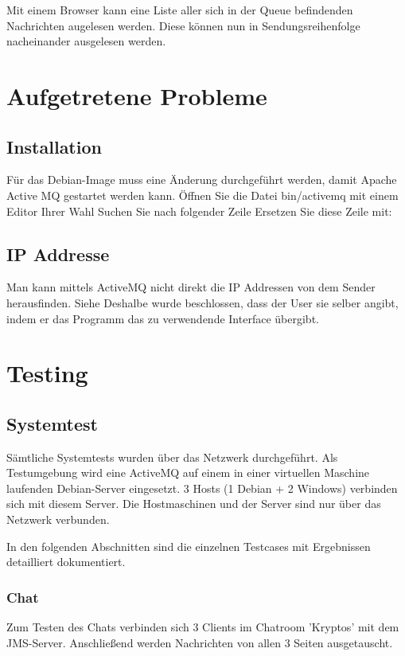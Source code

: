 \documentclass[11pt, a4paper]{article}
\begin{document}
Mit einem Browser kann eine Liste aller sich in der Queue befindenden Nachrichten augelesen werden. Diese können nun in Sendungsreihenfolge nacheinander
ausgelesen werden.

\newpage

\section{Aufgetretene Probleme}
\subsection{Installation}
Für das Debian-Image muss eine Änderung durchgeführt werden, damit Apache Active MQ gestartet werden kann.
Öffnen Sie die Datei bin/activemq mit einem Editor Ihrer Wahl 
Suchen Sie nach folgender Zeile
Ersetzen Sie diese Zeile mit:
\subsection{IP Addresse}
Man kann mittels ActiveMQ nicht direkt die IP Addressen von dem Sender herausfinden. Siehe 
Deshalbe wurde beschlossen, dass der User sie selber angibt, indem er das Programm das zu verwendende Interface übergibt.

\newpage

\section{Testing}
\subsection{Systemtest}
Sämtliche Systemtests wurden über das Netzwerk durchgeführt.
Als Testumgebung wird eine ActiveMQ auf einem in einer virtuellen Maschine laufenden Debian-Server eingesetzt. 3 Hosts (1 Debian + 2 Windows) verbinden sich
mit diesem Server. Die Hostmaschinen und der Server sind nur über das Netzwerk verbunden.

In den folgenden Abschnitten sind die einzelnen Testcases mit Ergebnissen detailliert dokumentiert.

\subsubsection{Chat}
Zum Testen des Chats verbinden sich 3 Clients im Chatroom 'Kryptos' mit dem JMS-Server.
Anschließend werden Nachrichten von allen 3 Seiten ausgetauscht.
\end{document}
